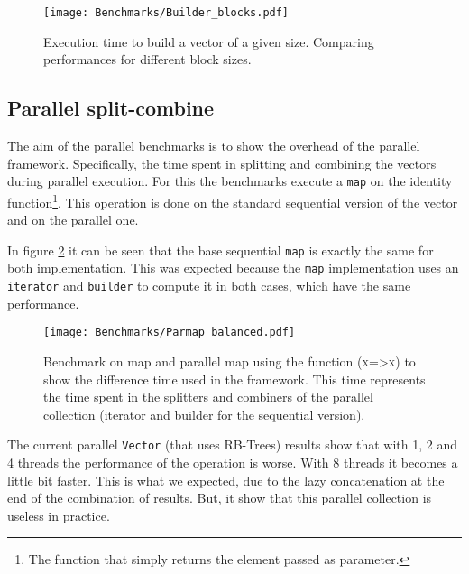 \begin{figure}[h!]
  \centering
  \texttt{[image: Benchmarks/Builder\_blocks.pdf]}
  \caption{Execution time to build a vector of a given size. Comparing performances for different block sizes.}
  \label{BuilderBlocksBenchmarks}
\end{figure}

\FloatBarrier

\subsection{Parallel split-combine}
The aim of the parallel benchmarks is to show the overhead of the parallel framework. Specifically, the time spent in splitting and combining the vectors during parallel execution. For this the benchmarks execute a \texttt{map} on the identity function\footnote{The function that simply returns the element passed as parameter.}. This operation is done on the standard sequential version of the vector and on the parallel one.

In figure \ref{ParallelBenchmarks} it can be seen that the base sequential \texttt{map} is exactly the same for both implementation. This was expected because the \texttt{map} implementation uses an \texttt{iterator} and \texttt{builder} to compute it in both cases, which have the same performance. 

\begin{figure}[h!]
  \centering
  \texttt{[image: Benchmarks/Parmap\_balanced.pdf]}
  \caption{Benchmark on map and parallel map using the function (\textsc{x=>x}) to show the difference time used in the framework. This time represents the time spent in the splitters and combiners of the parallel collection (iterator and builder for the sequential version).}
  \label{ParallelBenchmarks}
\end{figure}

The current parallel \texttt{Vector} (that uses RB-Trees) results show that with 1, 2 and 4 threads the performance of the operation is worse. With 8 threads it becomes a little bit faster. This is what we expected, due to the lazy concatenation at the end of the combination of results. But, it show that this parallel collection is useless in practice.

